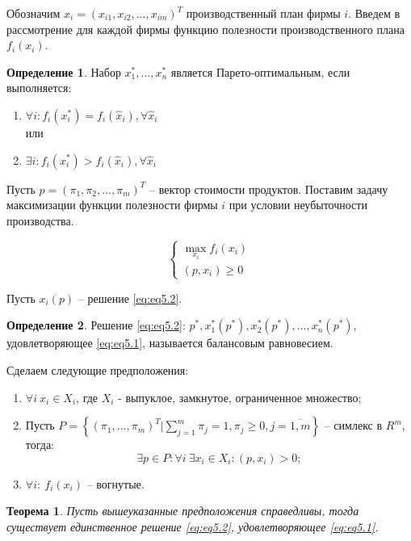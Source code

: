\documentclass[12pt,a4paper,titlepage,oneside]{book}
\theoremstyle{definition}
\newtheorem{definition}{Определение}[chapter]
\theoremstyle{plain}
\newtheorem{theorem}{Теорема}[chapter]
\theoremstyle{remark}
\theoremstyle{remark}
\theoremstyle{plain}
\theoremstyle{plain}
\begin{document}
Обозначим $x_i = (x_{i1},x_{i2}, ..., x_{im})^T$ производственный план фирмы $i$. Введем в рассмотрение для каждой фирмы функцию полезности производственного плана $f_i(x_i)$.

\begin{definition}
Набор $x_1^*, ..., x_n^*$ является Парето-оптимальным, если выполняется:
\begin{enumerate}
\item $\forall i:f_i(x_i^*) = f_i(\hat{x}_i),\forall \hat{x}_i$\\[1ex]
или
\item $\exists i:f_i(x_i^*) > f_i(\hat{x}_i),\forall \hat{x}_i$
\end{enumerate}
\end{definition}

Пусть $p=(\pi_1,\pi_2, ..., \pi_m)^T$ -- вектор стоимости продуктов. Поставим задачу максимизации функции полезности фирмы $i$ при условии неубыточности производства.

\begin{equation}\label{eq:eq5.2}
\begin{cases}
\displaystyle \max_{x_i} f_i(x_i)\\[2ex]
(p, x_i) \geqslant 0
\end{cases}
\end{equation}

Пусть $x_i(p)$ -- решение \eqref{eq:eq5.2}.

\begin{definition}
Решение \eqref{eq:eq5.2}: $p^*,x_1^*(p^*),x_2^*(p^*),...,x_n^*(p^*)$, удовлетворяющее \eqref{eq:eq5.1}, называется балансовым равновесием.
\end{definition}

Сделаем следующие предположения:
\begin{enumerate} \label{en:en1}
\item $\forall i~x_i \in X_i$, где $X_i$ - выпуклое, замкнутое, ограниченное множество;
\item Пусть $\displaystyle P = \left\{(\pi_1,...,\pi_m)^T|\sum_{j=1}^m \pi_j = 1, \pi_j \geqslant 0, j=\overline{1,m}\right\}$ -- симлекс в $\textit{R}^m$, тогда: $$\exists p \in P: \forall i~\exists x_i \in X_i: (p,x_i)>0;$$
\item $\forall i:~f_i(x_i)$ -- вогнутые.
\end{enumerate}

\begin{theorem}
Пусть вышеуказанные предположения справедливы, тогда существует единственное решение \eqref{eq:eq5.2}, удовлетворяющее \eqref{eq:eq5.1}.
\end{theorem}
\end{document}
